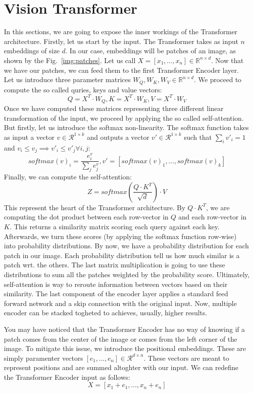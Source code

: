 \section{Vision Transformer}\label{sects:Transformer}
In this sections, we are going to expose the inner workings of the Transformer architecture. Firstly, let us start by the input. The Transformer takes as input $n$ embeddings of size $d$. In our case, embeddings will be patches of an image, as shown by the Fig.~\ref{img:patches}. Let us call $X = [x_1, \dots, x_n] \in \mathbb{R}^{n\times d}$. Now that we have our patches, we can feed them to the first Transformer Encoder layer. Let us introduce three parameter matrices $W_Q, W_K, W_V \in \mathbb{R}^{n\times d}$. We proceed to compute the so called quries, keys and value vectors:
\[Q = X^T\cdot W_Q, K = X^T\cdot W_K, V = X^T\cdot W_V\]
Once we have computed these matrices representing three different linear transformation of the input, we proceed by applying the so called self-attention. But firstly, let us introduce the softmax non-linearity. The softmax function takes as input a vector $v \in \mathcal{R}^{1\times k}$ and outputs a vector $v' \in \mathcal{R}^{1\times k}$ such that $\sum_i v'_i = 1$ and $v_i \leq v_j \implies v'_i \leq v'_j \forall i,j$:
\[softmax(v)_i = \frac{e^v_i}{\sum_j{e^v_j}}, v'=[softmax(v)_1,\dots,softmax(v)_k]\]
Finally, we can compute the self-attention:
\[Z = softmax(\frac{Q\cdot K^T}{\sqrt{d}})\cdot V\]
This represent the heart of the Transformer architecture. By $Q \cdot K^T$, we are computing the dot product between each row-vector in $Q$ and each row-vector in $K$. This returns a similarity matrix scoring each query against each key. Afterwards, we turn these scores (by applying the softmax function row-wise) into probability distributions. By now, we have a probability distribution for each patch in our image. Each probability distribution tell us how much similar is a patch wrt. the others. The last matrix multiplication is going to use these distributions to sum all the patches weighted by the probability score. Ultimately, self-attention is way to reroute information between vectors based on their similarity.
The last component of the encoder layer applies a standard feed forward network and a skip connection with the original input. Now, multiple encoder can be stacked togheted to achieves, usually, higher results.

You may have noticed that the Transformer Encoder has no way of knowing if a patch comes from the center of the image or comes from the left corner of the image. To mitigate this issue, we introduce the positional embeddings. These are simply paramenter vectors $[e_1, \dots, e_n]\in\mathcal{R}^{d\times n}$. These vectors are meant to represent positions and are summed altoghter with our input. We can redefine the Transformer Encoder input as follows:
\[X = [x_1+e_1,\dots,x_n+e_n]\]


